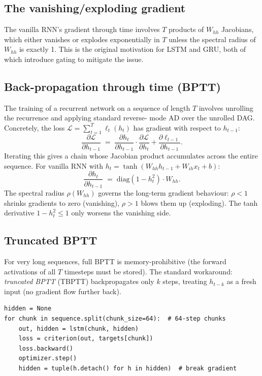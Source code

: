 \subsection{The vanishing/exploding gradient}
\label{ssec:rnn_family:vanishing}

The vanilla RNN's gradient through time involves $T$ products of
$W_{hh}$ Jacobians, which either vanishes or explodes
exponentially in $T$ unless the spectral radius of $W_{hh}$ is
exactly 1. This is the original motivation for LSTM and GRU,
both of which introduce gating to mitigate the issue.

\subsection{Back-propagation through time (BPTT)}
\label{ssec:rnn_family:bptt}

The training of a recurrent network on a sequence of length $T$
involves unrolling the recurrence and applying standard reverse-
mode AD over the unrolled DAG. Concretely, the loss
$\mathcal{L} = \sum_{t=1}^T \ell_t(h_t)$ has gradient with
respect to $h_{t-1}$:
\[
  \frac{\partial \mathcal{L}}{\partial h_{t-1}}
  \;=\;
  \frac{\partial h_t}{\partial h_{t-1}} \cdot
  \frac{\partial \mathcal{L}}{\partial h_t}
  + \frac{\partial \ell_{t-1}}{\partial h_{t-1}}.
\]
Iterating this gives a chain whose Jacobian product accumulates
across the entire sequence. For vanilla RNN with
$h_t = \tanh(W_{hh} h_{t-1} + W_{ih} x_t + b)$:
\[
  \frac{\partial h_t}{\partial h_{t-1}}
  \;=\;
  \mathrm{diag}(1 - h_t^2) \cdot W_{hh}.
\]
The spectral radius $\rho(W_{hh})$ governs the long-term gradient
behaviour: $\rho < 1$ shrinks gradients to zero (vanishing),
$\rho > 1$ blows them up (exploding). The tanh derivative
$1 - h_t^2 \leq 1$ only worsens the vanishing side.

\subsection{Truncated BPTT}
\label{ssec:rnn_family:truncated_bptt}

For very long sequences, full BPTT is memory-prohibitive (the
forward activations of all $T$ timesteps must be stored). The
standard workaround: \emph{truncated BPTT} (TBPTT) backpropagates
only $k$ steps, treating $h_{t-k}$ as a fresh input (no gradient
flow further back).

\begin{lstlisting}[style=lucid,language=LucidPython]
hidden = None
for chunk in sequence.split(chunk_size=64):  # 64-step chunks
    out, hidden = lstm(chunk, hidden)
    loss = criterion(out, targets[chunk])
    loss.backward()
    optimizer.step()
    hidden = tuple(h.detach() for h in hidden)  # break gradient
\end{lstlisting}

